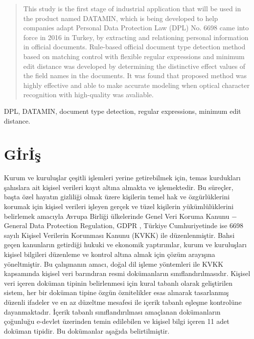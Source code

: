 \documentclass[conference, a4paper]{IEEEtran}
\begin{document}
\begin{abstract}
    This study is the first stage of industrial application that will be used in the product named DATAMIN, which is
    being developed to help companies adapt Personal Data Protection Law (DPL) No. 6698 came into force in 2016 in
    Turkey, by extracting and relationing personal information in official documents. Rule-based official document type
    detection method based on matching control with flexible regular expressions and minimum edit distance was
    developed by determining the distinctive effect values of the field names in the documents. It was found that
    proposed method was highly effective and able to make accurate modeling when optical character recognition with
    high-quality was avaliable.
\end{abstract}

\begin{IEEEkeywords}
    DPL, DATAMIN, document type detection, regular expressions, minimum edit distance.
\end{IEEEkeywords}

\IEEEpeerreviewmaketitle

\IEEEpubidadjcol

\section{G{\footnotesize İ}r{\footnotesize İ}ş}
\label{sect:giris}
Kurum ve kuruluşlar çeşitli işlemleri yerine getirebilmek için, temas kurdukları şahıslara ait kişisel verileri kayıt
altına almakta ve işlemektedir. Bu süreçler, başta özel hayatın gizliliği olmak üzere kişilerin temel hak ve
özgürlüklerini korumak için kişisel verileri işleyen gerçek ve tüzel kişilerin yükümlülüklerini belirlemek amacıyla
Avrupa Birliği ülkelerinde Genel Veri Koruma Kanunu $-$General Data Protection Regulation, GDPR
\cite{otto2018regulation}, Türkiye Cumhuriyetinde ise 6698 sayılı Kişisel Verilerin Korunması Kanunu (KVKK) ile
\cite{turkiye2016title} düzenlenmiştir. Bahsi geçen kanunların getirdiği hukuki ve ekonomik yaptırımlar, kurum ve
kuruluşları kişisel bilgileri düzenleme ve kontrol altına almak için çözüm arayışına yöneltmiştir. Bu çalışmanın amacı,
doğal dil işleme yöntemleri ile KVKK kapsamında kişisel veri barındıran resmi dokümanların sınıflandırılmasıdır.
Kişisel veri içeren doküman tipinin belirlenmesi için kural tabanlı olarak geliştirilen sistem, her bir doküman tipine
özgün öznitelikler esas alınarak tasarlanmış düzenli ifadeler ve en az düzeltme mesafesi ile içerik tabanlı eşleşme
kontrolüne dayanmaktadır. İçerik tabanlı sınıflandırılması amaçlanan dokümanların çoğunluğu e-devlet üzerinden temin
edilebilen ve kişisel bilgi içeren 11 adet doküman tipidir. Bu dokümanlar aşağıda belirtilmiştir.
\end{document}
